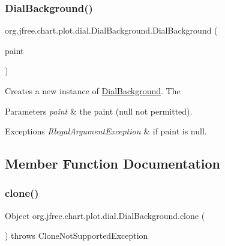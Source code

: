 \subsubsection{\texorpdfstring{Dial\+Background()}{DialBackground()}\hspace{0.1cm}{\footnotesize\ttfamily [2/2]}}
{\footnotesize\ttfamily org.\+jfree.\+chart.\+plot.\+dial.\+Dial\+Background.\+Dial\+Background (\begin{DoxyParamCaption}\item[{Paint}]{paint }\end{DoxyParamCaption})}

Creates a new instance of {\ttfamily \mbox{\hyperlink{classorg_1_1jfree_1_1chart_1_1plot_1_1dial_1_1_dial_background}{Dial\+Background}}}. The


\begin{DoxyParams}{Parameters}
{\em paint} & the paint ({\ttfamily null} not permitted).\\
\hline
\end{DoxyParams}

\begin{DoxyExceptions}{Exceptions}
{\em Illegal\+Argument\+Exception} & if {\ttfamily paint} is {\ttfamily null}. \\
\hline
\end{DoxyExceptions}


\subsection{Member Function Documentation}
\mbox{\label{classorg_1_1jfree_1_1chart_1_1plot_1_1dial_1_1_dial_background_a87b1683bd8ab95ce6073617d47968665}} 
\subsubsection{\texorpdfstring{clone()}{clone()}}
{\footnotesize\ttfamily Object org.\+jfree.\+chart.\+plot.\+dial.\+Dial\+Background.\+clone (\begin{DoxyParamCaption}{ }\end{DoxyParamCaption}) throws Clone\+Not\+Supported\+Exception}

